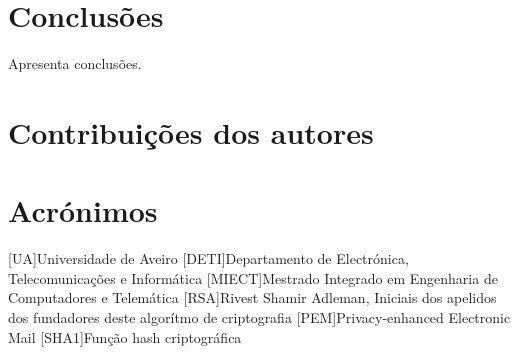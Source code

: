 \documentclass{report}
\begin{document}
\chapter{Conclusões}
\label{chap.conclusao}
Apresenta conclusões.

\chapter*{Contribuições dos autores}

%

\chapter*{Acrónimos}
\begin{acronym}
 [UA]{Universidade de Aveiro}
 [DETI]{Departamento de Electrónica, Telecomunicações e Informática}
 [MIECT]{Mestrado Integrado em Engenharia de Computadores e Telemática}
 [RSA]{Rivest Shamir Adleman, Iniciais dos apelidos dos fundadores deste algorítmo de criptografia}
 [PEM]{Privacy-enhanced Electronic Mail}
 [SHA1]{Função hash criptográfica}
\end{acronym}


%
\end{document}
